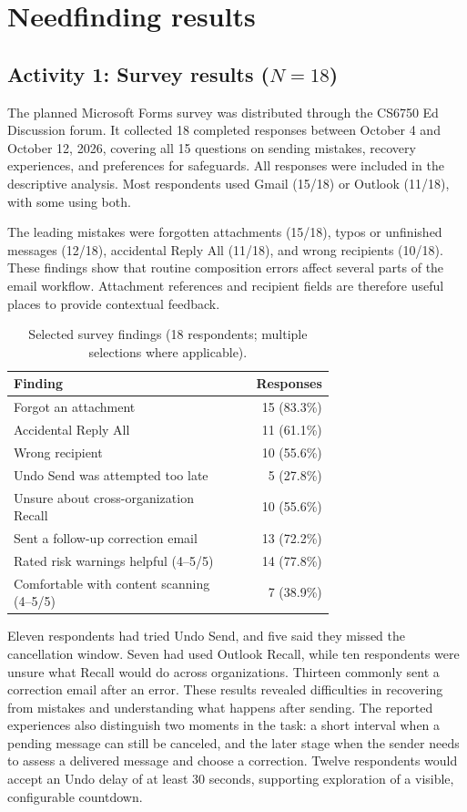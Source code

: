 \documentclass[letterpaper]{jdf}
\begin{document}
\section{Needfinding results}
\subsection{Activity 1: Survey results ($N=18$)}
The planned Microsoft Forms survey was distributed through the CS6750 Ed Discussion forum. It collected 18 completed responses between October 4 and October 12, 2026, covering all 15 questions on sending mistakes, recovery experiences, and preferences for safeguards. All responses were included in the descriptive analysis. Most respondents used Gmail (15/18) or Outlook (11/18), with some using both.

The leading mistakes were forgotten attachments (15/18), typos or unfinished messages (12/18), accidental Reply All (11/18), and wrong recipients (10/18). These findings show that routine composition errors affect several parts of the email workflow. Attachment references and recipient fields are therefore useful places to provide contextual feedback.

\begin{table}[htbp]
\centering
\caption{Selected survey findings (18 respondents; multiple selections where applicable).}
\begin{tabular}{p{0.70\linewidth}r}
\toprule
Finding & Responses \\
\midrule
Forgot an attachment & 15 (83.3\%) \\
Accidental Reply All & 11 (61.1\%) \\
Wrong recipient & 10 (55.6\%) \\
Undo Send was attempted too late & 5 (27.8\%) \\
Unsure about cross-organization Recall & 10 (55.6\%) \\
Sent a follow-up correction email & 13 (72.2\%) \\
Rated risk warnings helpful (4--5/5) & 14 (77.8\%) \\
Comfortable with content scanning (4--5/5) & 7 (38.9\%) \\
\bottomrule
\end{tabular}
\end{table}

Eleven respondents had tried Undo Send, and five said they missed the cancellation window. Seven had used Outlook Recall, while ten respondents were unsure what Recall would do across organizations. Thirteen commonly sent a correction email after an error. These results revealed difficulties in recovering from mistakes and understanding what happens after sending. The reported experiences also distinguish two moments in the task: a short interval when a pending message can still be canceled, and the later stage when the sender needs to assess a delivered message and choose a correction. Twelve respondents would accept an Undo delay of at least 30 seconds, supporting exploration of a visible, configurable countdown.
\end{document}
